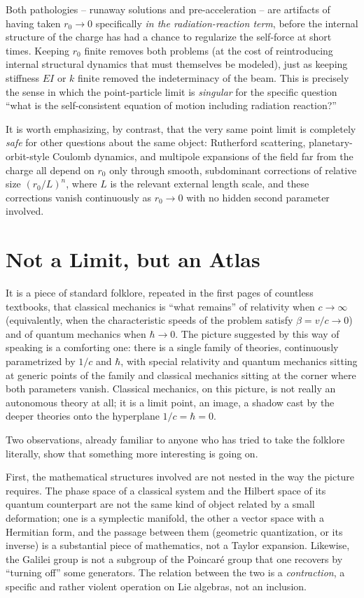 Both pathologies -- runaway solutions and pre-acceleration --
are artifacts of having taken $r_0\to0$ specifically \emph{in
the radiation-reaction term}, before the internal structure of
the charge has had a chance to regularize the self-force at
short times. Keeping $r_0$ finite removes both problems (at the
cost of reintroducing internal structural dynamics that must
themselves be modeled), just as keeping stiffness $EI$ or $k$ finite
removed the indeterminacy of the beam.
This is precisely the
sense in which the point-particle limit is \emph{singular} for
the specific question ``what is the self-consistent equation of
motion including radiation reaction?''

It is worth emphasizing, by contrast, that the very same point
limit is completely \emph{safe} for other questions about the
same object: Rutherford scattering, planetary-orbit-style
Coulomb dynamics, and multipole expansions of the field far from
the charge all depend on $r_0$ only through smooth, subdominant
corrections of relative size $(r_0/L)^n$, where $L$ is the
relevant external length scale, and these corrections vanish
continuously as $r_0\to0$ with no hidden second parameter
involved. 

\section{Not a Limit, but an Atlas}
\label{lm:at}

It is a piece of standard folklore, repeated in the first pages of countless
textbooks, that classical mechanics is ``what remains'' of relativity when
$c\to\infty$ (equivalently, when the characteristic speeds of the problem
satisfy $\beta = v/c \to 0$) and of quantum mechanics when $\hbar\to 0$. The
picture suggested by this way of speaking is a comforting one: there is a
single family of theories, continuously parametrized by $1/c$ and $\hbar$, with
special relativity and quantum mechanics sitting at generic points of the
family and classical mechanics sitting at the corner where both parameters
vanish. Classical mechanics, on this picture, is not really an autonomous
theory at all; it is a limit point, an image, a shadow cast by the deeper
theories onto the hyperplane $1/c=\hbar=0$.

 Two observations, already familiar to anyone who has tried to take the
folklore literally, show that something more interesting is going on.

First, the mathematical structures involved are not nested in the way the
picture requires. The phase space of a classical system and the Hilbert space
of its quantum counterpart are not the same kind of object related by a small
deformation; one is a symplectic manifold, the other a vector space with a
Hermitian form, and the passage between them (geometric quantization, or its
inverse) is a substantial piece of mathematics, not a Taylor expansion.
Likewise, the Galilei group is not a subgroup of the Poincar\'e group that one
recovers by ``turning off'' some generators. The relation between the
two is a \emph{contraction}, a specific and rather violent operation on Lie
algebras, not an inclusion.

